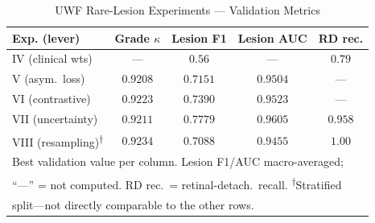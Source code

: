 \documentclass[journal,twoside,web]{ieeecolor}
\begin{document}
\begin{table}[!t]
\caption{UWF Rare-Lesion Experiments --- Validation Metrics}
\label{tab:uwf_rare}
\centering
\setlength{\tabcolsep}{3pt}
\begin{tabular}{|l|c|c|c|c|}
\hline
\textbf{Exp. (lever)} & \textbf{Grade $\kappa$} & \textbf{Lesion F1} &
\textbf{Lesion AUC} & \textbf{RD rec.} \\
\hline
IV (clinical wts) & --- & $0.56$ & --- & $0.79$ \\
V (asym.\ loss) & $0.9208$ & $0.7151$ & $0.9504$ & --- \\
VI (contrastive) & $0.9223$ & $0.7390$ & $0.9523$ & --- \\
VII (uncertainty) & $0.9211$ & $0.7779$ & $0.9605$ & $0.958$ \\
VIII (resampling)\textsuperscript{$\dagger$} & $0.9234$ & $0.7088$ & $0.9455$ & $1.00$ \\
\hline
\multicolumn{5}{|l|}{\footnotesize Best validation value per column. Lesion F1/AUC
macro-averaged;} \\
\multicolumn{5}{|l|}{\footnotesize ``---'' = not computed. RD rec.\ = retinal-detach.\
recall. \textsuperscript{$\dagger$}Stratified} \\
\multicolumn{5}{|l|}{\footnotesize split---not directly comparable to the other rows.} \\
\hline
\end{tabular}
\end{table}
\end{document}
